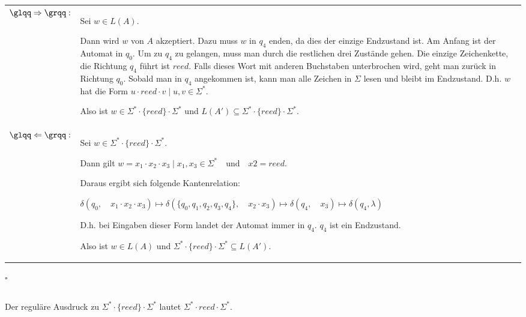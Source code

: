\documentclass[12pt,a4paper]{../krautsourcing/homework}
\begin{document}
\begin{tabularx}{\linewidth}{@{}>{\bfseries}l@{\hspace{.5em}}X@{}}
    \(\glqq\Rightarrow\grqq:\) &
    Sei \(w \in L(A) \).

    Dann wird \(w\) von \(A\) akzeptiert. Dazu muss \(w\) in \(q_4\) enden, da dies der einzige Endzustand ist. Am Anfang ist der Automat in \(q_0\). Um zu \(q_4\) zu gelangen, muss man durch die restlichen drei Zustände gehen. Die einzige Zeichenkette, die Richtung \(q_4\) führt ist \(reed\). Falls dieses Wort mit anderen Buchstaben unterbrochen wird, geht man zurück in Richtung \(q_0\). Sobald man in \(q_4\) angekommen ist, kann man alle Zeichen in $\Sigma$ lesen und bleibt im Endzustand. D.h. \(w\) hat die Form  \( u \cdot reed \cdot v \mid u,v \in \Sigma^*\).

    Also ist \(w \in \Sigma^* \cdot \{reed\} \cdot \Sigma^* \) und \(L(A') \subseteq\Sigma^* \cdot \{reed\} \cdot \Sigma^*\).

     \\

    \(\glqq\Leftarrow\grqq:\) &
    Sei \(w \in \Sigma^* \cdot \{reed\} \cdot \Sigma^*\).

    Dann gilt \(w = x_1 \cdot x_2 \cdot x_3 \mid x_1,x_3 \in \Sigma^* \quad \text{und} \quad x2 = reed \).
    
    Daraus ergibt sich folgende Kantenrelation:
    
    \( 
    \delta (q_0, \quad x_1 \cdot x_2 \cdot x_3) \mapsto 
    \delta (\{q_0,q_1,q_2,q_3,q_4 \}, \quad x_2 \cdot x_3) \mapsto
    \delta (q_4, \quad x_3) \mapsto 
    \delta (q_4, \lambda) 
    \)

    D.h. bei Eingaben dieser Form landet der Automat immer in \(q_4\). \(q_4\) ist ein Endzustand.

	Also ist \(w \in L(A)\) und \(\Sigma^* \cdot \{reed\} \cdot \Sigma^* \subseteq L(A')\).	  
\end{tabularx}

\hfill \(\square\)

\subsection{}
Der reguläre Ausdruck zu \(\Sigma^* \cdot \{reed\} \cdot \Sigma^*\) lautet \(\Sigma^* \cdot reed \cdot \Sigma^*\).
\end{document}
